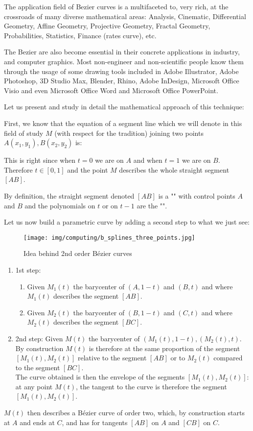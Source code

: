 	The application field of Bezier curves is a multifaceted to, very rich, at the crossroads of many diverse mathematical areas: Analysis, Cinematic, Differential Geometry,  Affine Geometry, Projective Geometry, Fractal Geometry, Probabilities, Statistics, Finance (rates curve), etc.
	
	The Bezier are also become essential in their concrete applications in industry, and computer graphics. Most non-engineer and non-scientific people know them through the usage of some drawing tools included in Adobe Illustrator, Adobe Photoshop, 3D Studio Max, Blender, Rhino, Adobe InDesign, Microsoft Office Visio and even Microsoft Office Word and Microsoft Office PowerPoint.
	
	Let us present and study in detail the mathematical approach of this technique:
	
	First, we know that the equation of a segment line which we will denote in this field of study $M$ (with respect for the tradition) joining two points $A(x_1,y_1),B(x_2,y_2)$ is:
	
	This is right since when $t=0$ we are on $A$ and when $t=1$ we are on $B$. Therefore $t\in[0,1]$ and the point $M$ describes the whole straight segment $[AB]$.
	
	By definition, the straight segment denoted $[AB]$ is a "" with control points $A$ and $B$ and the polynomials on $t$ or on $t-1$ are the "\label{bernstein polynomial}".
	
	Let us now build a parametric curve by adding a second step to what we just see:
	\begin{figure}[H]
		\centering
		\texttt{[image: img/computing/b\_splines\_three\_points.jpg]}
		\caption{Idea behind 2nd order Bézier curves}
	\end{figure}
	\begin{enumerate}
		\item 1st step:
		\begin{enumerate}
			\item Given $M_1(t)$ the barycenter of $(A,1-t)$ and $(B,t)$ and where $M_1(t)$ describes the segment $[AB]$.
			\item  Given $M_2(t)$ the barycenter of $(B,1-t)$ and $(C,t)$ and where $M_2(t)$ describes the segment $[BC]$.
		\end{enumerate}
		\item 2nd step:
		Given $M(t)$ the barycenter of $(M_1(t),1-t),(M_2(t),t)$.\\
			
		By construction $M (t)$ is therefore at the same proportion of the segment $[M_1(t),M_2(t)]$ relative to the segment $[AB]$ or to $M_2(t)$ compared to the segment $[BC]$.\\
			
		The curve obtained is then the envelope of the segments $[M_1(t),M_2(t)]$: at any point $M(t)$, the tangent to the curve is therefore the segment $[M_1(t),M_2(t)]$.
	\end{enumerate}
	$M (t)$ then describes a Bézier curve of order two, which, by construction starts at $A$ and ends at $C$, and has for tangents $[AB]$ on $A$ and $[CB]$ on $C$.
	
